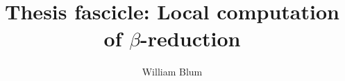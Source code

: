 

\author{William Blum}
\title{Thesis fascicle: Local computation of $\beta$-reduction}



    \maketitle
    \tableofcontents
    \clearpage

    

    
    



\printtodomargin 